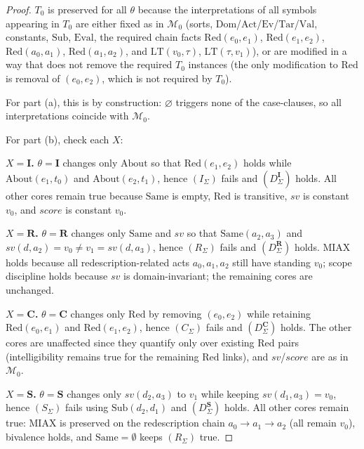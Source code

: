 \documentclass[12pt]{article}
\begin{document}
\begin{proof}
$T_0$ is preserved for all $\theta$ because the interpretations of all symbols appearing in $T_0$ are either fixed as in $\mathcal{M}_0$
(sorts, $\mathrm{Dom}$/$\mathrm{Act}$/$\mathrm{Ev}$/$\mathrm{Tar}$/$\mathrm{Val}$, constants, $\mathrm{Sub}$, $\mathrm{Eval}$, the required chain facts
$\mathrm{Red}(e_0,e_1)$, $\mathrm{Red}(e_1,e_2)$, $\mathrm{Red}(a_0,a_1)$, $\mathrm{Red}(a_1,a_2)$, and $\mathrm{LT}(v_0,\tau)$, $\mathrm{LT}(\tau,v_1)$),
or are modified in a way that does not remove the required $T_0$ instances (the only modification to $\mathrm{Red}$ is removal of $(e_0,e_2)$, which is not required by $T_0$).

For part (a), this is by construction: $\varnothing$ triggers none of the case-clauses, so all interpretations coincide with $\mathcal{M}_0$.

For part (b), check each $X$:

\textbf{$X=\mathbf{I}$.} $\theta=\mathbf{I}$ changes only $\mathrm{About}$ so that $\mathrm{Red}(e_1,e_2)$ holds while $\mathrm{About}(e_1,t_0)$ and $\mathrm{About}(e_2,t_1)$, hence $(I_\Sigma)$ fails and $(D^{\mathbf{I}}_\Sigma)$ holds. All other cores remain true because $\mathrm{Same}$ is empty, $\mathrm{Red}$ is transitive, $sv$ is constant $v_0$, and $score$ is constant $v_0$.

\textbf{$X=\mathbf{R}$.} $\theta=\mathbf{R}$ changes only $\mathrm{Same}$ and $sv$ so that $\mathrm{Same}(a_2,a_3)$ and $sv(d,a_2)=v_0\neq v_1=sv(d,a_3)$, hence $(R_\Sigma)$ fails and $(D^{\mathbf{R}}_\Sigma)$ holds. MIAX holds because all redescription-related acts $a_0,a_1,a_2$ still have standing $v_0$; scope discipline holds because $sv$ is domain-invariant; the remaining cores are unchanged.

\textbf{$X=\mathbf{C}$.} $\theta=\mathbf{C}$ changes only $\mathrm{Red}$ by removing $(e_0,e_2)$ while retaining $\mathrm{Red}(e_0,e_1)$ and $\mathrm{Red}(e_1,e_2)$, hence $(C_\Sigma)$ fails and $(D^{\mathbf{C}}_\Sigma)$ holds. The other cores are unaffected since they quantify only over existing $\mathrm{Red}$ pairs (intelligibility remains true for the remaining $\mathrm{Red}$ links), and $sv$/$score$ are as in $\mathcal{M}_0$.

\textbf{$X=\mathbf{S}$.} $\theta=\mathbf{S}$ changes only $sv(d_2,a_3)$ to $v_1$ while keeping $sv(d_1,a_3)=v_0$, hence $(S_\Sigma)$ fails using $\mathrm{Sub}(d_2,d_1)$ and $(D^{\mathbf{S}}_\Sigma)$ holds. All other cores remain true: MIAX is preserved on the redescription chain $a_0\to a_1\to a_2$ (all remain $v_0$), bivalence holds, and $\mathrm{Same}=\emptyset$ keeps $(R_\Sigma)$ true.


\end{proof}
\end{document}

